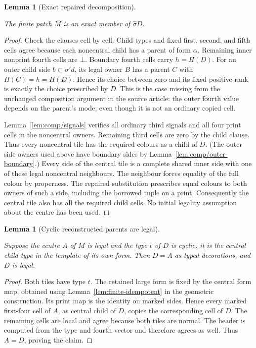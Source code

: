 \documentclass[11pt,a4paper]{article}
\newtheorem{lemma}[definition]{Lemma}
\theoremstyle{remark}
\newcommand{\lean}[1]{}
\newcommand{\uses}[1]{}
\begin{document}
\begin{lemma}[Exact repaired decomposition]
\label{lem:comp/exact}
\lean{Tilings.Planned.macroblock_is_decomposition,Tilings.Planned.Strict.strict_macroblock_is_decomposition}
\uses{lem:comp/reconstruction,lem:comp/signals,def:control/substitution}
The finite patch $M$ is an exact member of $\widehat\sigma D$.
\end{lemma}
\begin{proof}
Check the clauses cell by cell. Child types and fixed first, second, and
fifth cells agree because each noncentral child has a parent of form $\alpha$.
Remaining inner nonprint fourth cells are $\bot$. Boundary fourth cells carry
$h=H(D)$. For an outer child side $b\subset\sigma'd$, its legal owner $B$
has a parent $C$ with $H(C)=h=H(D)$. Hence its choice between zero and its
fixed positive rank is exactly the choice prescribed by $D$. This is the
case missing from the unchanged composition argument in the source article:
the outer fourth value depends on the parent's mode, even though it is
not an ordinary copied cell.

Lemma~\ref{lem:comp/signals} verifies all ordinary third signals and all
four print cells in the noncentral owners. Remaining third cells are zero
by the child clause. Thus every noncentral tile has the required colours
as a child of $D$. (The outer-side owners used above have boundary sides
by Lemma~\ref{lem:comp/outer-boundary}.) Every side of the central tile is
a complete shared inner side with one of these legal noncentral neighbours. The neighbour forces
equality of the full colour by properness. The repaired substitution
prescribes equal colours to both owners of such a side, including the
borrowed tuple on a print. Consequently the central tile also has all the
required child cells. No initial legality assumption about the centre
has been used.
\end{proof}

\begin{lemma}[Cyclic reconstructed parents are legal]
\label{lem:comp/cyclic-legal}
\lean{Tilings.Planned.reconstructed_cyclic_legal,Tilings.Planned.Strict.strict_reconstructed_cyclic_legal}
\uses{lem:comp/exact,def:certificate,def:control/legal,lem:finite-idempotent}
Suppose the centre $A$ of $M$ is legal and the type $t$ of $D$ is cyclic:
it is the central child type in the template of its own form. Then $D=A$
as typed decorations, and $D$ is legal.
\end{lemma}
\begin{proof}
Both tiles have type $t$. The retained large form is fixed by the central
form map, obtained using Lemma~\ref{lem:finite-idempotent} in the geometric
construction. Its print map is the identity on marked sides. Hence every
marked first-four cell of $A$, as central child of $D$, copies the
corresponding cell of $D$. The remaining cells are local and agree because
both tiles are normal. The header is computed from the type and fourth
vector and therefore agrees as well. Thus $A=D$, proving the claim.
\end{proof}
\end{document}
